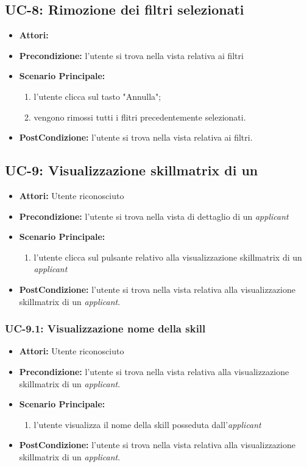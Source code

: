 \subsection{UC-8: Rimozione dei filtri selezionati}
\begin{itemize}
\item \textbf{Attori:}\loggedusr
\item \textbf{Precondizione:} l'utente si trova nella vista relativa ai filtri
\item \textbf{Scenario Principale:}
\begin{enumerate}
	\item l'utente clicca sul tasto "Annulla";
	\item vengono rimossi tutti i flitri precedentemente selezionati.
\end{enumerate}
\item \textbf{PostCondizione:} l'utente si trova nella vista relativa ai filtri.
\end{itemize}

\subsection{UC-9: Visualizzazione skillmatrix di un \applicant}
\begin{itemize}
\item \textbf{Attori:} Utente riconosciuto
\item \textbf{Precondizione:}  l'utente si trova nella vista di dettaglio di un \textit{applicant}
\item \textbf{Scenario Principale:}
\begin{enumerate}
	\item l'utente clicca sul pulsante relativo alla visualizzazione skillmatrix di un \textit{applicant}
\end{enumerate}
\item \textbf{PostCondizione:} l'utente si trova nella vista relativa alla visualizzazione skillmatrix di un \textit{applicant}.
\end{itemize}

\subsubsection{UC-9.1: Visualizzazione nome della skill}
\begin{itemize}
\item \textbf{Attori:} Utente riconosciuto
\item \textbf{Precondizione:}  l'utente si trova nella vista relativa alla visualizzazione skillmatrix di un \textit{applicant}.
\item \textbf{Scenario Principale:}
\begin{enumerate}
	\item l'utente visualizza il nome della skill posseduta dall'\textit{applicant}
\end{enumerate}
\item \textbf{PostCondizione:}  l'utente si trova nella vista relativa alla visualizzazione skillmatrix di un \textit{applicant}.
\end{itemize}

